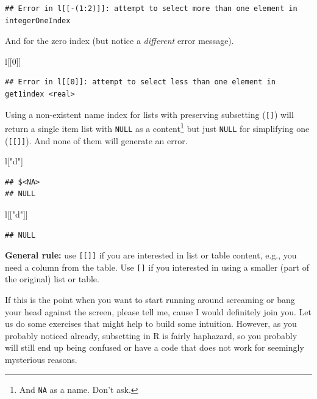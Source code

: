 \documentclass[
]{book}
\newenvironment{Shaded}{\begin{snugshade}}{\end{snugshade}}
\newcommand{\DecValTok}[1]{\textcolor[rgb]{0.00,0.00,0.81}{#1}}
\newcommand{\NormalTok}[1]{#1}
\newcommand{\StringTok}[1]{\textcolor[rgb]{0.31,0.60,0.02}{#1}}
\begin{document}
\begin{verbatim}
## Error in l[[-(1:2)]]: attempt to select more than one element in integerOneIndex
\end{verbatim}

And for the zero index (but notice a \emph{different} error message).

\begin{Shaded}
\begin{Highlighting}[]
\NormalTok{l[[}\DecValTok{0}\NormalTok{]]}
\end{Highlighting}
\end{Shaded}

\begin{verbatim}
## Error in l[[0]]: attempt to select less than one element in get1index <real>
\end{verbatim}

Using a non-existent name index for lists with preserving subsetting (\texttt{{[}{]}}) will return a single item list with \texttt{NULL} as a content\footnote{And \texttt{NA} as a name. Don't ask.} but just \texttt{NULL} for simplifying one (\texttt{{[}{[}{]}{]}}). And none of them will generate an error.

\begin{Shaded}
\begin{Highlighting}[]
\NormalTok{l[}\StringTok{"d"}\NormalTok{]}
\end{Highlighting}
\end{Shaded}

\begin{verbatim}
## $<NA>
## NULL
\end{verbatim}

\begin{Shaded}
\begin{Highlighting}[]
\NormalTok{l[[}\StringTok{"d"}\NormalTok{]]}
\end{Highlighting}
\end{Shaded}

\begin{verbatim}
## NULL
\end{verbatim}

\textbf{General rule:} use \texttt{{[}{[}{]}{]}} if you are interested in list or table content, e.g., you need a column from the table. Use \texttt{{[}{]}} if you interested in using a smaller (part of the original) list or table.

If this is the point when you want to start running around screaming or bang your head against the screen, please tell me, cause I would definitely join you. Let us do some exercises that might help to build some intuition. However, as you probably noticed already, subsetting in R is fairly haphazard, so you probably will still end up being confused or have a code that does not work for seemingly mysterious reasons.
\end{document}
